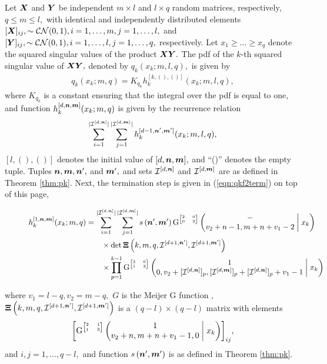 \begin{theorem}
	\label{thm:qk}
	Let $\boldsymbol{X}$ and $\boldsymbol{Y}$ be independent $m\times l$ and $l\times q$ random matrices, respectively, $q \leq m \leq l,$ with identical and independently distributed elements $[\boldsymbol{X}]_{ij}, \sim \mathcal{CN}(0,1), i=1,\dots,m,j=1,\dots,l,$ and $[\boldsymbol{Y}]_{ij}, \sim \mathcal{CN}(0,1), i=1,\dots,l,j=1,\dots,q,$ respectively. Let $x_1 \geq \dots \geq x_q$ denote the squared singular values of the product $\boldsymbol{X}\boldsymbol{Y}.$ The pdf of the $k$-th squared singular value of $\boldsymbol{X}\boldsymbol{Y},$ denoted by $q_k(x_k; m, l, q),$ is given by
	\begin{align}
		q_k(x_k; m, q) = K_{q_k} h^{[k,(),()]}_k(x_k; m, l, q),
	\end{align}
	where $K_{q_k}$ is a constant ensuring that the integral over the pdf is equal to one, and function $h^{[d,\boldsymbol{n},\boldsymbol{m}]}_k(x_k; m, q)$ is given by the recurrence relation
	\begin{align}
		\sum_{i = 1}^{|{\mathcal{I}}^{[d,\boldsymbol{n}]}|} \sum_{j = 1}^{|{\mathcal{I}}^{[d,\boldsymbol{m}]}|} h^{[d-1,\boldsymbol{n}',\boldsymbol{m}']}_k(x_k; m,l,q), \label{eqn:qkrec}
	\end{align}
	$[l,(),()]$ denotes the initial value of $[d,\boldsymbol{n},\boldsymbol{m}],$ and ``()'' denotes the empty tuple. Tuples $\boldsymbol{n}, \boldsymbol{m},\boldsymbol{n}',$ and $\boldsymbol{m}',$  and sets ${\mathcal{I}}^{[d, \boldsymbol{n}]}$ and ${\mathcal{I}}^{[d, \boldsymbol{m}]}$ are as defined in Theorem \ref{thm:pk}. Next, the termination step is given in (\ref{eqn:qkf2term}) on top of this page,
	\begin{figure*}
		\begin{align}
			h^{[1,\boldsymbol{n},\boldsymbol{m}]}_k(x_k; m, q) &= \sum_{i = 1}^{|{\mathcal{I}}^{[d,\boldsymbol{n}]}|} \sum_{j = 1}^{|{\mathcal{I}}^{[d,\boldsymbol{m}]}|} s\left(\boldsymbol{n}',\boldsymbol{m}'\right)
			\mathrm{G}^{\tiny\begin{bmatrix} 2&0\\0&2 \end{bmatrix}}\left(\begin{matrix} - \\ v_2+n-1, m+n+v_1-2 \end{matrix}\;\middle|\;x_k\right) \nonumber\\
			&\qquad \times \det{\boldsymbol{\Xi}\left(k, m, q, {\mathcal{I}}^{[d+1,\boldsymbol{n}']},{\mathcal{I}}^{[d+1,\boldsymbol{m}']}\right)} \nonumber\\
			&\qquad \times \prod_{p = 1}^{k-1} \mathrm{G}^{\tiny\begin{bmatrix} 3&0\\1&3 \end{bmatrix}}\left(\begin{matrix} 1 \\ 0, v_2+[{\mathcal{I}}^{[d,\boldsymbol{n}]}]_p, [{\mathcal{I}}^{[d,\boldsymbol{m}]}]_p + [{\mathcal{I}}^{[d,\boldsymbol{n}]}]_p+v_1 - 1 \end{matrix}\;\middle|\;x_k\right)\label{eqn:qkf2term}
		\end{align}
		\hrulefill
	\end{figure*}
	where $v_1=l-q, v_2=m-q,$ $G$ is the Meijer G function \cite{Olver2010}, $\boldsymbol{\Xi}\left(k, m, q, {\mathcal{I}}^{[d+1,\boldsymbol{n}']},{\mathcal{I}}^{[d+1,\boldsymbol{m}']}\right)$ is a $(q-l)\times (q-l)$ matrix with elements 
	\begin{equation}
		\scalemath{1}{\left[\G{2}{1}{1}{3}{1}{v_2+n,m+n+v_1-1,0}{x_k}\right]_{ij}}, \label{eqn:qkf2mat}
	\end{equation}
	and $i,j=1,\dots,q-l,$ and function $s\left(\boldsymbol{n}',\boldsymbol{m}'\right)$ is as defined in Theorem \ref{thm:pk}.
\end{theorem}

